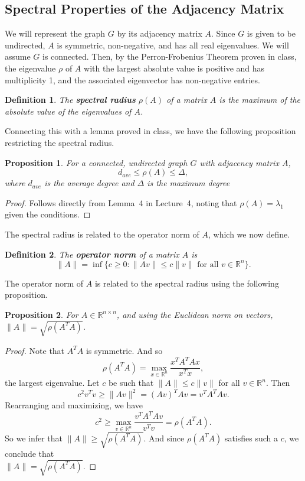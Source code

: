 \documentclass[11pt]{article}
\newtheorem{definition}{Definition}[section]
\newtheorem{proposition}{Proposition}[section]
\begin{document}
\subsection{Spectral Properties of the Adjacency Matrix}

We will represent the graph $G$ by its adjacency matrix $A$. Since $G$ is given to be undirected, $A$ is symmetric, non-negative, and has all real eigenvalues. We will assume $G$ is connected. Then, by the Perron-Frobenius Theorem proven in class, the eigenvalue $\rho$ of $A$ with the largest absolute value is positive and has multiplicity 1, and the associated eigenvector has non-negative entries.

\begin{definition}
The \textbf{spectral radius} $\rho(A)$ of a matrix $A$ is the maximum of the absolute value of the eigenvalues of $A$.
\end{definition}

Connecting this with a lemma proved in class, we have the following proposition restricting the spectral radius.

\begin{proposition} \label{prop:max_degree}
For a connected, undirected graph $G$ with adjacency matrix $A$,
$$d_{ave} \leq \rho(A) \leq \Delta,$$ where $d_{ave}$ is the average degree and $\Delta$ is the maximum degree
\end{proposition}

\begin{proof}
Follows directly from Lemma~4 in Lecture~4, noting that $\rho(A) = \lambda_1$ given the conditions.
\end{proof}

The spectral radius is related to the operator norm of $A$, which we now define.

\begin{definition}
The \textbf{operator norm} of a matrix $A$ is
$$\| A\| = \inf \{ c \geq 0 : \| Av\| \leq c \| v \| \text{ for all } v \in \mathbb{R}^n \}.$$
\end{definition}

The operator norm of $A$ is related to the spectral radius using the following proposition.

\begin{proposition} \label{prop:matrix_norm}
For $A\in \mathbb{R}^{n\times n}$, and using the Euclidean norm on vectors, $\|A\| = \sqrt{\rho(A^T A)}$.
\end{proposition}

\begin{proof}
Note that $A^T A$ is symmetric. And so
$$\rho(A^T A) = \max_{x\in \mathbb{R}^n} \frac{x^T A^T A x}{x^T x},$$
the largest eigenvalue. Let $c$ be such that $\|A\| \leq c \|v\|$ for all $v\in \mathbb{R}^n$. Then
$$c^2 v^T v \geq \|A v\|^2 = (Av)^T Av = v^T A^T A v.$$
Rearranging and maximizing, we have
$$ c^2 \geq \max_{v\in \mathbb{R}^n}\frac{v^T A^T Av}{v^T v} = \rho(A^T A).$$
So we infer that $\|A\| \geq \sqrt{\rho(A^T A)}$. And since $\rho(A^T A)$ satisfies such a $c$, we conclude that \\
$\|A\| = \sqrt{\rho(A^T A)}$.
\end{proof}
\end{document}
